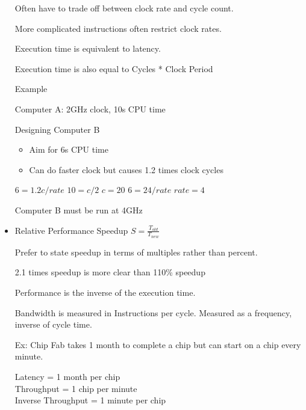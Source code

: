 \documentclass{report}
\begin{document}
\begin{mdframed}
\begin{itemize}
            Often have to trade off between clock rate and
            cycle count.

            More complicated instructions often restrict clock
            rates.

            Execution time is equivalent to latency.

            Execution time is also equal to Cycles * Clock Period

            \begin{mdframed}
                Example

                Computer A: 2GHz clock, 10s CPU time

                Designing Computer B
                \begin{itemize}
                    \item Aim for 6s CPU time
                    \item Can do faster clock but causes 1.2 times
                        clock cycles
                \end{itemize}

                $6 = 1.2c / rate$
                $10 = c / 2$
                $c = 20$
                $6 = 24 / rate$
                $rate = 4$

                Computer B must be run at 4GHz


            \end{mdframed}
        \item Relative Performance Speedup
            $S = \frac{T_{old}}{T_{new}}$

            Prefer to state speedup in terms of multiples rather
            than percent.

            2.1 times speedup is more clear than 110\% speedup

            \begin{mdframed}
                Performance is the inverse of the execution time.

                Bandwidth is measured in Instructions per cycle.
                Measured as a frequency, inverse of cycle time.

                Ex: Chip Fab takes 1 month to complete a chip
                but can start on a chip every minute.

                Latency = 1 month per chip\\
                Throughput = 1 chip per minute\\
                Inverse Throughput = 1 minute per chip


\end{mdframed}
\end{itemize}
\end{mdframed}
\end{document}
